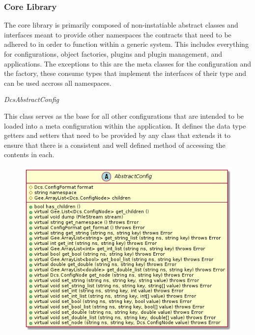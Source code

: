 
    \subsubsection{Core Library}\label{sec:dsg-classes-core}

      The core library is primarily composed of non-instatiable abstract classes
      and interfaces meant to provide other namespaces the contracts that need
      to be adhered to in order to function within a generic system. This
      includes everything for configurations, object factories, plugins and
      plugin management, and applications. The exceptions to this are the meta
      classes for the configuration and the factory, these consume types that
      implement the interfaces of their type and can be used accross all
      namespaces.

      \emph{DcsAbstractConfig}

      \vspace*{-0.75cm}
      \begin{minipage}[t]{0.5\textwidth}
        \vspace*{0.5cm}
        This class serves as the base for all other configurations that are
        intended to be loaded into a meta configuration within the application.
        It defines the data type getters and setters that need to be provided
        by any class that extends it to ensure that there is a consistent and
        well defined method of accessing the contents in each.
      \end{minipage} \hfill
      \begin{minipage}[t]{0.45\textwidth}
        \begin{figure}[H]
          \includegraphics[width=\textwidth]{figures/design/class/core/abstract-config}
          \label{fig:dsg-classes-abs-config}
        \end{figure}
      \end{minipage}

